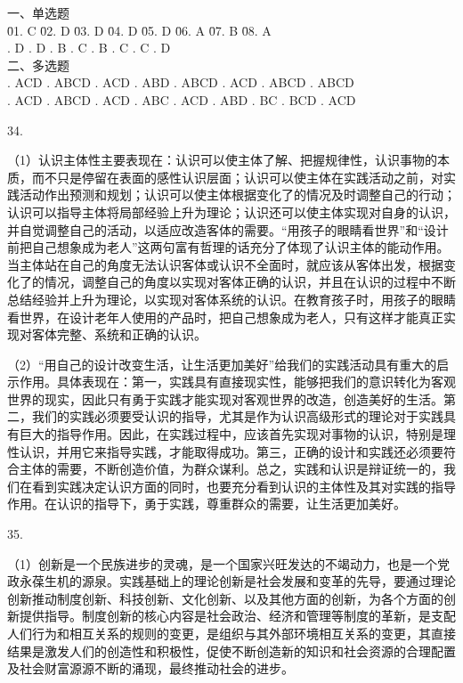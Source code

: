 \documentclass[a4paper]{article}
\begin{document}
\begin{tabbing}
一、单选题\\
\= 01. C \qquad \= 02. D \qquad \= 03. D \qquad \= 04. D \qquad \= 05. D \qquad \= 06. A \qquad \= 07. B \qquad \= 08. A \qquad \= \\
. D . D . B . C . B . C . C . D \\
二、多选题\\
. ACD . ABCD . ACD . ABD . ABCD . ACD . ABCD . ABCD \\
. ACD . ABCD . ACD . ABC . ACD . ABD . BC . BCD . ACD \\
\end{tabbing}

34.

（1）认识主体性主要表现在：认识可以使主体了解、把握规律性，认识事物的本质，而不只是停留在表面的感性认识层面；认识可以使主体在实践活动之前，对实践活动作出预测和规划；认识可以使主体根据变化了的情况及时调整自己的行动；认识可以指导主体将局部经验上升为理论；认识还可以使主体实现对自身的认识，并自觉调整自己的活动，以适应改造客体的需要。“用孩子的眼睛看世界”和“设计前把自己想象成为老人”这两句富有哲理的话充分了体现了认识主体的能动作用。当主体站在自己的角度无法认识客体或认识不全面时，就应该从客体出发，根据变化了的情况，调整自己的角度以实现对客体正确的认识，并且在认识的过程中不断总结经验并上升为理论，以实现对客体系统的认识。在教育孩子时，用孩子的眼睛看世界，在设计老年人使用的产品时，把自己想象成为老人，只有这样才能真正实现对客体完整、系统和正确的认识。

（2）“用自己的设计改变生活，让生活更加美好”给我们的实践活动具有重大的启示作用。具体表现在：第一，实践具有直接现实性，能够把我们的意识转化为客观世界的现实，因此只有勇于实践才能实现对客观世界的改造，创造美好的生活。第二，我们的实践必须要受认识的指导，尤其是作为认识高级形式的理论对于实践具有巨大的指导作用。因此，在实践过程中，应该首先实现对事物的认识，特别是理性认识，并用它来指导实践，才能取得成功。第三，正确的设计和实践还必须要符合主体的需要，不断创造价值，为群众谋利。总之，实践和认识是辩证统一的，我们在看到实践决定认识方面的同时，也要充分看到认识的主体性及其对实践的指导作用。在认识的指导下，勇于实践，尊重群众的需要，让生活更加美好。

35.

（1）创新是一个民族进步的灵魂，是一个国家兴旺发达的不竭动力，也是一个党政永葆生机的源泉。实践基础上的理论创新是社会发展和变革的先导，要通过理论创新推动制度创新、科技创新、文化创新、以及其他方面的创新，为各个方面的创新提供指导。制度创新的核心内容是社会政治、经济和管理等制度的革新，是支配人们行为和相互关系的规则的变更，是组织与其外部环境相互关系的变更，其直接结果是激发人们的创造性和积极性，促使不断创造新的知识和社会资源的合理配置及社会财富源源不断的涌现，最终推动社会的进步。
\end{document}
